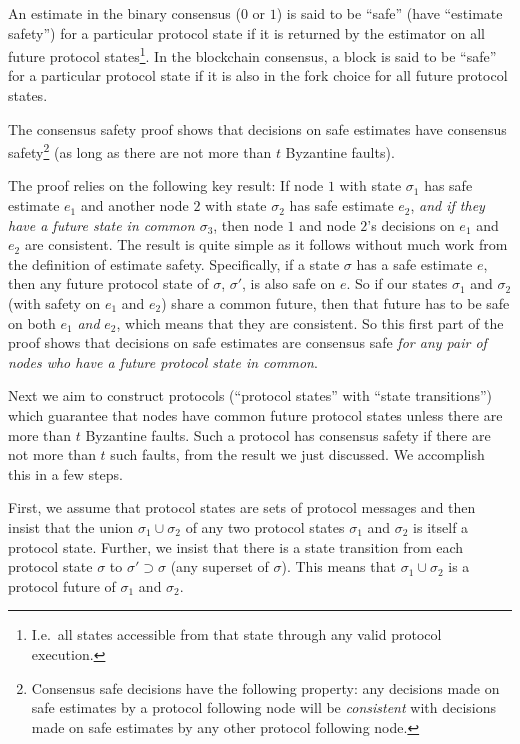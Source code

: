 \documentclass{article}
\theoremstyle{definition}
\begin{document}
An estimate in the binary consensus ($0$ or $1$) is said to be ``safe'' (have ``estimate safety'') for a particular protocol state if it is returned by the estimator on all future protocol states\footnote{I.e.\ all states accessible from that state through any valid protocol execution.}. In the blockchain consensus, a block is said to be ``safe'' for a particular protocol state if it is also in the fork choice for all future protocol states.

The consensus safety proof shows that decisions on safe estimates have consensus safety\footnote{Consensus safe decisions have the following property: any decisions made on safe estimates by a protocol following node will be \emph{consistent} with decisions made on safe estimates by any other protocol following node.} (as long as there are not more than $t$ Byzantine faults).

The proof relies on the following key result: If node $1$ with state $\sigma_1$ has safe estimate $e_1$ and another node $2$ with state $\sigma_2$ has safe estimate $e_2$, \emph{and if they have a future state in common $\sigma_3$}, then node $1$ and node $2$'s decisions on $e_1$ and $e_2$ are consistent. The result is quite simple as it follows without much work from the definition of estimate safety. Specifically, if a state $\sigma$ has a safe estimate $e$, then any future protocol state of $\sigma$, $\sigma'$, is also safe on $e$. So if our states $\sigma_1$ and $\sigma_2$ (with safety on $e_1$ and $e_2$) share a common future, then that future has to be safe on both $e_1$ \emph{and} $e_2$, which means that they are consistent. So this first part of the proof shows that decisions on safe estimates are consensus safe \emph{for any pair of nodes who have a future protocol state in common}.

Next we aim to construct protocols (``protocol states'' with ``state transitions'') which guarantee that nodes have common future protocol states unless there are more than $t$ Byzantine faults. Such a protocol has consensus safety if there are not more than $t$ such faults, from the result we just discussed. We accomplish this in a few steps.

First, we assume that protocol states are sets of protocol messages and then insist that the union $\sigma_1 \cup \sigma_2$ of any two protocol states $\sigma_1$ and $\sigma_2$ is itself a protocol state. Further, we insist that there is a state transition from each protocol state $\sigma$ to $\sigma' \supset \sigma$ (any superset of $\sigma$). This means that $\sigma_1 \cup \sigma_2$ is a protocol future of $\sigma_1$ and $\sigma_2$.
\end{document}

